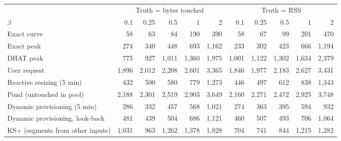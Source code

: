 \begin{tabular}{lrrrrrrrrrr}
\toprule
 & \multicolumn{5}{c}{Truth = bytes touched} & \multicolumn{5}{c}{Truth = RSS} \\
\cmidrule(lr){2-6} \cmidrule(lr){7-11}
$\beta$ & 0.1 & 0.25 & 0.5 & 1 & 2 & 0.1 & 0.25 & 0.5 & 1 & 2 \\
\midrule
Exact curve & 58 & 63 & 84 & 190 & 390 & 58 & 67 & 99 & 201 & 470 \\
Exact peak & 274 & 340 & 448 & 693 & 1{,}162 & 233 & 302 & 423 & 666 & 1{,}194 \\
DHAT peak & 775 & 927 & 1{,}011 & 1{,}360 & 1{,}975 & 1{,}001 & 1{,}122 & 1{,}302 & 1{,}634 & 2{,}379 \\
User request & 1{,}896 & 2{,}012 & 2{,}208 & 2{,}601 & 3{,}365 & 1{,}846 & 1{,}977 & 2{,}183 & 2{,}627 & 3{,}431 \\
Reactive resizing (5 min) & 432 & 500 & 580 & 779 & 1{,}273 & 446 & 497 & 612 & 838 & 1{,}343 \\
Pond (untouched in pool) & 2{,}188 & 2{,}301 & 2{,}519 & 2{,}903 & 3{,}649 & 2{,}160 & 2{,}271 & 2{,}472 & 2{,}925 & 3{,}748 \\
Dynamic provisioning (5 min) & 286 & 332 & 457 & 568 & 1{,}021 & 274 & 363 & 395 & 594 & 932 \\
Dynamic provisioning, look-back & 481 & 439 & 504 & 686 & 1{,}121 & 460 & 507 & 493 & 706 & 1{,}064 \\
KS+ (segments from other inputs) & 1{,}031 & 963 & 1{,}262 & 1{,}378 & 1{,}828 & 704 & 741 & 844 & 1{,}215 & 1{,}282 \\
\bottomrule
\end{tabular}
